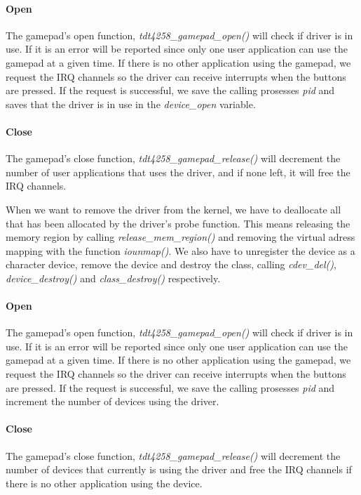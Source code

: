 \paragraph{Open} The gamepad's open function, \emph{tdt4258\_gamepad\_open()} will check if driver is in use. If it is an error will be reported since only one user application can use the gamepad at a given time. If there is no other application using the gamepad, we request the IRQ channels so the driver can receive interrupts when the buttons are pressed. If the request is successful, we save the calling prosesses \emph{pid} and saves that the driver is in use in the \emph{device\_open} variable.    

\paragraph{Close} The gamepad's close function, \emph{tdt4258\_gamepad\_release()} will decrement the number of user applications that uses the driver, and if none left, it will free the IRQ channels.

When we want to remove the driver from the kernel, we have to deallocate all that has been allocated by the driver's probe function. This means releasing the memory region by calling \emph{release\_mem\_region()} and removing the virtual adress mapping with the function \emph{iounmap()}. We also have to unregister the device as a character device, remove the device and destroy the class, calling \emph{cdev\_del()}, \emph{device\_destroy()} and \emph{class\_destroy()} respectively. 

\paragraph{Open} The gamepad's open function, \emph{tdt4258\_gamepad\_open()} will check if driver is in use. If it is an error will be reported since only one user application can use the gamepad at a given time. If there is no other application using the gamepad, we request the IRQ channels so the driver can receive interrupts when the buttons are pressed. If the request is successful, we save the calling prosesses \emph{pid} and increment the number of devices using the driver.    
\paragraph{Close} The gamepad's close function, \emph{tdt4258\_gamepad\_release()} will decrement the number of devices that currently is using the driver and free the IRQ channels if there is no other application using the device.
